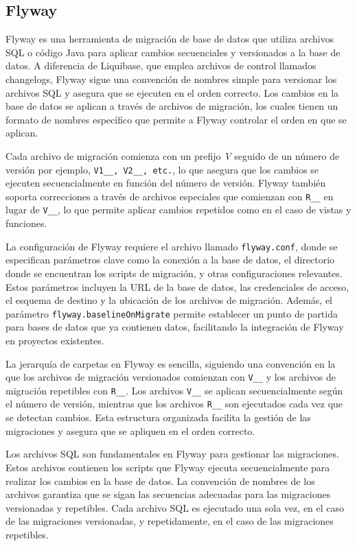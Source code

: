 \documentclass{IEEEtran}
\begin{document}
\subsection{Flyway}
Flyway es una herramienta de migración de base de datos que utiliza archivos SQL o código Java para aplicar cambios secuenciales y versionados a la base de datos. A diferencia de Liquibase, que emplea archivos de control llamados changelogs, Flyway sigue una convención de nombres simple para versionar los archivos SQL y asegura que se ejecuten en el orden correcto. Los cambios en la base de datos se aplican a través de archivos de migración, los cuales tienen un formato de nombres específico que permite a Flyway controlar el orden en que se aplican. 

Cada archivo de migración comienza con un prefijo \textit{V} seguido de un número de versión por ejemplo, \texttt{V1\_\_, V2\_\_, etc.}, lo que asegura que los cambios se ejecuten secuencialmente en función del número de versión. Flyway también soporta correcciones a través de archivos especiales que comienzan con \texttt{R\_\_} en lugar de \texttt{V\_\_}, lo que permite aplicar cambios repetidos como en el caso de vistas y funciones.

La configuración de Flyway requiere el archivo llamado \texttt{flyway.conf}, donde se especifican parámetros clave como la conexión a la base de datos, el directorio donde se encuentran los scripts de migración, y otras configuraciones relevantes. Estos parámetros incluyen la URL de la base de datos, las credenciales de acceso, el esquema de destino y la ubicación de los archivos de migración. Además, el parámetro \texttt{flyway.baselineOnMigrate} permite establecer un punto de partida para bases de datos que ya contienen datos, facilitando la integración de Flyway en proyectos existentes.

La jerarquía de carpetas en Flyway es sencilla, siguiendo una convención en la que los archivos de migración versionados comienzan con \texttt{V\_\_} y los archivos de migración repetibles con \texttt{R\_\_}. Los archivos \texttt{V\_\_} se aplican secuencialmente según el número de versión, mientras que los archivos \texttt{R\_\_} son ejecutados cada vez que se detectan cambios. Esta estructura organizada facilita la gestión de las migraciones y asegura que se apliquen en el orden correcto.

Los archivos SQL son fundamentales en Flyway para gestionar las migraciones. Estos archivos contienen los scripts que Flyway ejecuta secuencialmente para realizar los cambios en la base de datos. La convención de nombres de los archivos garantiza que se sigan las secuencias adecuadas para las migraciones versionadas y repetibles. Cada archivo SQL es ejecutado una sola vez, en el caso de las migraciones versionadas, y repetidamente, en el caso de las migraciones repetibles.
\end{document}
